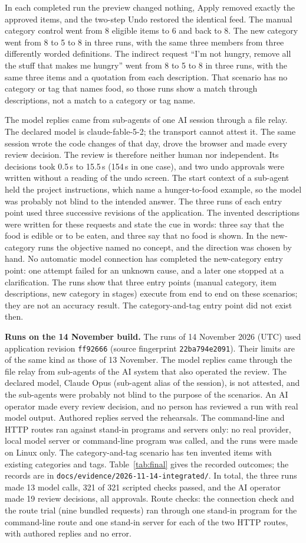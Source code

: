 \documentclass[conference]{IEEEtran}
\newcommand{\FinalRunDate}{14 November 2026 (UTC)}
\newcommand{\FinalRevision}{\texttt{ff92666}}
\newcommand{\FinalFingerprint}{\texttt{22ba794e2091}}
\newcommand{\FinalEvidencePath}{\texttt{docs/evidence/2026-11-14-integrated/}}
\newcommand{\FinalModel}{Claude Opus (sub-agent alias of the session)}
\newcommand{\FinalScenarioItems}{ten}
\newcommand{\FinalAssertions}{the three runs made 13 model calls, 321 of 321 scripted checks passed, and the AI operator made 19 review decisions, all approvals}
\newcommand{\FinalRouteChecks}{the connection check and the route trial (nine bundled requests) ran through one stand-in program for the command-line route and one stand-in server for each of the two HTTP routes, with authored replies and no error}
\begin{document}
In each completed run the preview changed nothing, Apply removed exactly the approved items, and the two-step Undo restored the identical feed. The manual category control went from 8 eligible items to 6 and back to 8. The new category went from 8 to 5 to 8 in three runs, with the same three members from three differently worded definitions. The indirect request ``I'm not hungry, remove all the stuff that makes me hungry'' went from 8 to 5 to 8 in three runs, with the same three items and a quotation from each description. That scenario has no category or tag that names food, so those runs show a match through descriptions, not a match to a category or tag name.

The model replies came from sub-agents of one AI session through a file relay. The declared model is claude-fable-5-2; the transport cannot attest it. The same session wrote the code changes of that day, drove the browser and made every review decision. The review is therefore neither human nor independent. Its decisions took 0.5\,s to 15.5\,s (154\,s in one case), and two undo approvals were written without a reading of the undo screen. The start context of a sub-agent held the project instructions, which name a hunger-to-food example, so the model was probably not blind to the intended answer. The three runs of each entry point used three successive revisions of the application. The invented descriptions were written for these requests and state the cue in words: three say that the food is edible or to be eaten, and three say that no food is shown. In the new-category runs the objective named no concept, and the direction was chosen by hand. No automatic model connection has completed the new-category entry point: one attempt failed for an unknown cause, and a later one stopped at a clarification. The runs show that three entry points (manual category, item descriptions, new category in stages) execute from end to end on these scenarios; they are not an accuracy result. The category-and-tag entry point did not exist then.

\textbf{Runs on the 14 November build.} The runs of \FinalRunDate{} used application revision \FinalRevision{} (source fingerprint \FinalFingerprint). Their limits are of the same kind as those of 13 November. The model replies came through the file relay from sub-agents of the AI system that also operated the review. The declared model, \FinalModel, is not attested, and the sub-agents were probably not blind to the purpose of the scenarios. An AI operator made every review decision, and no person has reviewed a run with real model output. Authored replies served the rehearsals. The command-line and HTTP routes ran against stand-in programs and servers only: no real provider, local model server or command-line program was called, and the runs were made on Linux only. The category-and-tag scenario has \FinalScenarioItems{} invented items with existing categories and tags. Table~\ref{tab:final} gives the recorded outcomes; the records are in \FinalEvidencePath. In total, \FinalAssertions. Route checks: \FinalRouteChecks.
\end{document}
